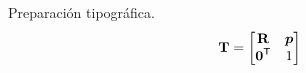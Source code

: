 \documentclass[11pt,oneside]{report}
\begin{document}
Preparación tipográfica.
\begin{equation}\mathbf{T}=\begin{bmatrix}\mathbf{R}&\boldsymbol{p}\\\boldsymbol{0}^{\mathsf{T}}&1\end{bmatrix}\end{equation}
\end{document}
